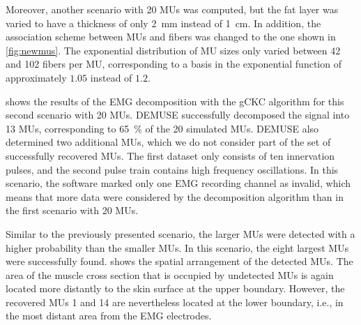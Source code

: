 Moreover, another scenario with 20 MUs was computed, but the fat layer was varied to have a thickness of only \SI{2}{\mm} instead of \SI{1}{\cm}. In addition, the association scheme between MUs and fibers was changed to the one shown in \cref{fig:newmus}. The exponential distribution of MU sizes only varied between 42 and 102 fibers per MU, corresponding to a basis in the exponential function of approximately $1.05$ instead of $1.2$.

 shows the results of the EMG decomposition with the gCKC algorithm for this second scenario with 20 MUs. DEMUSE successfully decomposed the signal into 13 MUs, corresponding to \SI{65}{\percent} of the 20 simulated MUs. DEMUSE also determined two additional MUs, which we do not consider part of the set of successfully recovered MUs. The first dataset only consists of ten innervation pulses, and the second pulse train contains high frequency oscillations.
In this scenario, the software marked only one EMG recording channel as invalid, which means that more data were considered by the decomposition algorithm than in the first scenario with 20 MUs.

Similar to the previously presented scenario, the larger MUs were detected with a higher probability than the smaller MUs. In this scenario, the eight largest MUs were successfully found. 
 shows the spatial arrangement of the detected MUs. The area of the muscle cross section that is occupied by undetected MUs is again located more distantly to the skin surface at the upper boundary. However, the recovered MUs 1 and 14 are nevertheless located at the lower boundary, i.e., in the most distant area from the EMG electrodes. 


